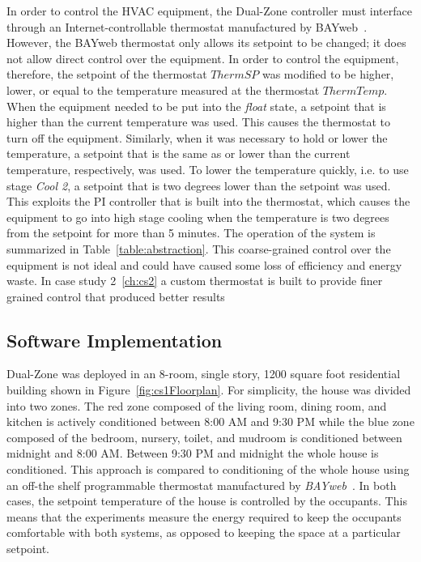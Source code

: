 In order to control the HVAC equipment, the Dual-Zone controller must
interface through an Internet-controllable thermostat manufactured by
BAYweb~\cite{bayweb}. However, the BAYweb thermostat only allows its setpoint to
be changed; it does not allow direct control over the equipment. In order to
control the equipment, therefore, the setpoint of the thermostat $ThermSP$ was
modified to be higher, lower, or equal to the temperature measured at the
thermostat $ThermTemp$.  When the equipment needed to be put into the {\em
float} state, a setpoint that is higher than the current temperature was used.
This causes the thermostat to turn off the equipment.  Similarly, when it was
necessary to hold or lower the temperature, a setpoint that is the same as or
lower than the current temperature, respectively, was used.  To lower the
temperature quickly, i.e. to use stage {\em Cool 2}, a setpoint that is two
degrees lower than the setpoint was used.  This exploits the PI controller that
is built into the thermostat, which causes the equipment to go into high stage
cooling when the temperature is two degrees from the setpoint for more than 5
minutes.  The operation of the system is summarized in
Table~\ref{table:abstraction}.  This coarse-grained control over the equipment
is not ideal and could have caused some loss of efficiency and energy waste.  In
case study 2~\ref{ch:cs2} a custom thermostat is built to provide finer grained
control that produced better results

\subsection{Software Implementation}

Dual-Zone was deployed in an 8-room, single story, 1200 square foot residential
building shown in Figure~\ref{fig:cs1Floorplan}.  For simplicity, the house was
divided into two zones.  The red zone composed of the living room, dining room,
and kitchen is actively conditioned between 8:00 AM and 9:30 PM while the blue
zone composed of the bedroom, nursery, toilet, and mudroom is conditioned
between midnight and 8:00 AM. Between 9:30 PM and midnight the whole house is
conditioned. This approach is compared to conditioning of the whole house using
an off-the shelf programmable thermostat manufactured by {\em
BAYweb}~\cite{bayweb}.  In both cases, the setpoint temperature of the house is
controlled by the occupants. This means that the experiments measure the energy
required to keep the occupants comfortable with both systems, as opposed to
keeping the space at a particular setpoint.

